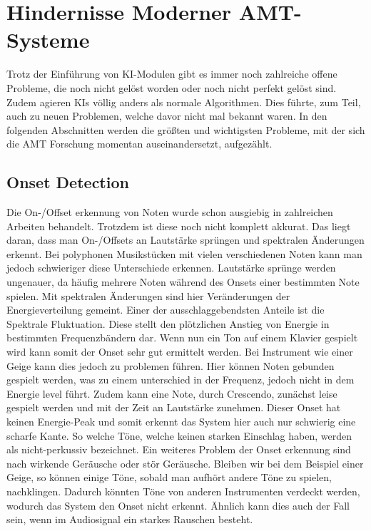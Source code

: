\section{Hindernisse Moderner AMT-Systeme}
Trotz der Einführung von KI-Modulen gibt es immer noch zahlreiche offene Probleme, die noch nicht gelöst worden
oder noch nicht perfekt gelöst sind.
Zudem agieren KIs völlig anders als normale Algorithmen.
Dies führte, zum Teil, auch zu neuen Problemen, welche davor nicht mal bekannt waren.
In den folgenden Abschnitten werden die größten und wichtigsten Probleme,
mit der sich die AMT Forschung momentan auseinandersetzt, aufgezählt.

\subsection{Onset Detection}
Die On-/Offset erkennung von Noten wurde schon ausgiebig in zahlreichen Arbeiten behandelt.
Trotzdem ist diese noch nicht komplett akkurat.
Das liegt daran, dass man On-/Offsets an Lautstärke sprüngen und spektralen Änderungen erkennt.
Bei polyphonen Musikstücken mit vielen verschiedenen Noten kann man jedoch schwieriger diese Unterschiede erkennen.
Lautstärke sprünge werden ungenauer, da häufig mehrere Noten während des Onsets einer bestimmten Note spielen.
Mit spektralen Änderungen sind hier Veränderungen der Energieverteilung gemeint.
Einer der ausschlaggebendsten Anteile ist die Spektrale Fluktuation.
Diese stellt den plötzlichen Anstieg von Energie in bestimmten Frequenzbändern dar.
Wenn nun ein Ton auf einem Klavier gespielt wird kann somit der Onset sehr gut ermittelt werden.
Bei Instrument wie einer Geige kann dies jedoch zu problemen führen.
Hier können Noten gebunden gespielt werden, was zu einem unterschied in der Frequenz,
jedoch nicht in dem Energie level führt.
Zudem kann eine Note, durch Crescendo, zunächst leise gespielt werden und mit der Zeit an Lautstärke zunehmen.
Dieser Onset hat keinen Energie-Peak und somit erkennt das System hier auch nur schwierig eine scharfe Kante.
So welche Töne, welche keinen starken Einschlag haben, werden als nicht-perkussiv bezeichnet.
Ein weiteres Problem der Onset erkennung sind nach wirkende Geräusche oder stör Geräusche.
Bleiben wir bei dem Beispiel einer Geige, so können einige Töne, sobald man aufhört andere Töne zu spielen, nachklingen.
Dadurch könnten Töne von anderen Instrumenten verdeckt werden, wodurch das System den Onset nicht erkennt.
Ähnlich kann dies auch der Fall sein, wenn im Audiosignal ein starkes Rauschen besteht.

